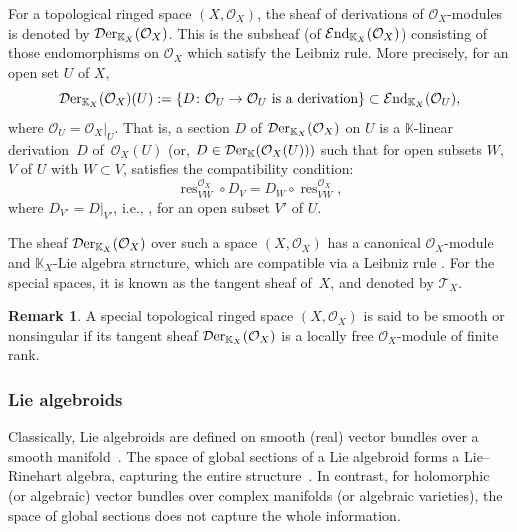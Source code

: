 \documentclass[pdftex]{sigma}
\numberwithin{equation}{section}
\theoremstyle{definition}
\newtheorem{Rem}[Thm]{Remark}
\begin{document}
For a topological ringed space $(X, \mathcal{O}_X)$, the sheaf of derivations of $\mathcal{O}_X$-modules is denoted by $\mathcal{D}{\rm er}_{\mathbb{K}_X}(\mathcal{O}_X)$. This is the subsheaf (of $\mathcal{E}{\rm nd}_{\mathbb{K}_X}(\mathcal{O}_X)$) consisting of those endomorphisms on $\mathcal{O}_X$ which satisfy the Leibniz rule.
More precisely, for an open set $U$ of $X$,
\[
\mathcal{D}{\rm er}_{\mathbb{K}_X}(\mathcal{O}_X)(U):= \{D\colon \mathcal{O}_U \rightarrow \mathcal{O}_U \mbox{ is a derivation}\} \subset \mathcal{E}{\rm nd}_{\mathbb{K}_X}(\mathcal{O}_U),
\]
 where $\mathcal{O}_U=\mathcal{O}_X|_U$. That is, a section $D$ of $\mathcal{D}{\rm er}_{\mathbb{K}_X}(\mathcal{O}_X)$ on $U$ is a $\mathbb{K}$-linear derivation~$D$ of~$\mathcal{O}_X(U)$ (or, $D \in \mathcal{D}{\rm er}_{\mathbb{K}}(\mathcal{O}_X(U)))$ such that
for open subsets $W$, $V$ of $U$ with $W \subset V$, satisfies the compatibility condition:
\[
\operatorname{res}_{VW}^{\mathcal{O}_X} \circ D_V= D_W \circ \operatorname{res}_{VW}^{\mathcal{O}_X},
\]
 where $D_{V'}= D|_{V'}$, i.e., , for an open subset $V'$ of $U$.

The sheaf $\mathcal{D}{\rm er}_{\mathbb{K}_X}(\mathcal{O}_X)$ over such a space $(X, \mathcal{O}_X)$ has a canonical $ \mathcal{O}_X$-module and $\mathbb{K}_X$-Lie algebra structure, which are compatible via a Leibniz rule \cite{MK,BP, SR}. For the special spaces, it is known as the tangent sheaf of~$X$, and denoted by $\mathcal{T}_X$.

\begin{Rem} \label{nonsingular}
	A special topological ringed space $(X,\mathcal{O}_X)$ is said to be smooth or nonsingular if its tangent sheaf $\mathcal{D}{\rm er}_{\mathbb{K}_X}(\mathcal{O}_X)$ is a locally free $\mathcal{O}_X$-module of finite rank.
\end{Rem}


\subsubsection{Lie algebroids}
Classically, Lie algebroids are defined on smooth (real) vector bundles over a smooth mani\-fold~\cite{KM}. The space of global sections of a Lie algebroid forms a Lie--Rinehart algebra, capturing the entire structure~\cite{JH}.
In contrast, for holomorphic (or algebraic) vector bundles over complex manifolds (or algebraic varieties), the space of global sections does not capture the whole information.
\end{document}
